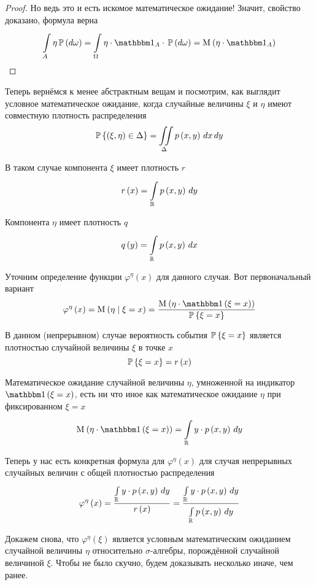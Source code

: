 \begin{proof}
Но ведь это и есть искомое математическое ожидание!
Значит, свойство доказано, формула верна
$$\integrall{A}{\probability{d\omega}}{\eta}
    = \integrall{\Omega}{\probability{d\omega}}{
        \eta \cdot \indicatorof{A} \cdot}
    = \mean{\left( \eta \cdot \indicatorof{A} \right)}$$
\end{proof}

Теперь вернёмся к менее абстрактным вещам и посмотрим,
как выглядит условное математическое ожидание,
когда случайные величины $\xi$ и $\eta$ имеют совместную плотность распределения
$$\Probability{\left( \xi, \eta \right) \in \Delta}
    = \iint\limits_\Delta\pdf{x,y} \, dx \, dy$$

В таком случае компонента $\xi$ имеет плотность $r$
$$r\left( x \right) = \integral{\mathbb{R}}{}{y}{\pdf{x,y}}$$

Компонента $\eta$ имеет плотность $q$
$$q\left( y \right) = \integral{\mathbb{R}}{}{x}{\pdf{x,y}}$$

Уточним определение функции $\varphi^{\eta}\left( x \right)$
для данного случая. Вот первоначальный вариант
$$\varphi^{\eta}\left( x \right)
    = \mean{\left( \eta \mid \xi=x \right)}
    = \frac{\mean{\left( \eta \cdot \indicator{\xi=x} \right)}}
        {\Probability{\xi=x}}$$

В данном (непрерывном) случае вероятность события $\Probability{\xi=x}$ является
плотностью случайной величины $\xi$ в точке $x$
$$\Probability{\xi=x} = r\left( x \right)$$

Математическое ожидание случайной величины $\eta$,
умноженной на индикатор $\indicator{\xi=x}$,
есть ни что иное как математическое ожидание $\eta$ при фиксированном $\xi=x$
$$\mean{\left( \eta \cdot \indicator{\xi=x} \right)}
    = \integral{\mathbb{R}}{}{y}{y \cdot \pdf{x,y}}$$

Теперь у нас есть конкретная формула для $\varphi^{\eta}\left( x \right)$
для случая непрерывных случайных величин с общей плотностью распределения
\begin{equation}\label{phiIntegral}
    \varphi^{\eta}\left( x \right)
        = \frac{\integral{\mathbb{R}}{}{y}{y \cdot \pdf{x,y}}}
            {r\left( x \right)}
        = \frac{\integral{\mathbb{R}}{}{y}{y \cdot \pdf{x,y}}}
            {\integral{\mathbb{R}}{}{y}{\pdf{x,y}}}
\end{equation}

Докажем снова, что $\varphi^\eta\left( \xi \right)$ является
условным математическим ожиданием случайной величины $\eta$
относительно $\sigma$-алгебры, порождённой случайной величиной $\xi$.
Чтобы не было скучно, будем доказывать несколько иначе, чем ранее.

